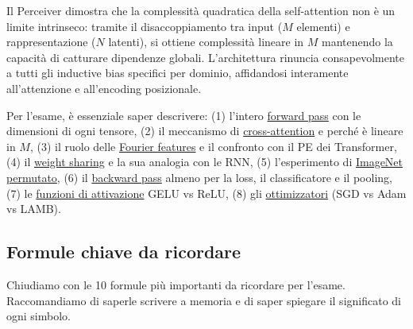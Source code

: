 \documentclass[12pt,a4paper]{article}
\begin{document}
\begin{notabox}
Il Perceiver dimostra che la complessit\`a quadratica della self-attention non \`e un limite intrinseco: tramite il disaccoppiamento tra input ($M$ elementi) e rappresentazione ($N$ latenti), si ottiene complessit\`a lineare in $M$ mantenendo la capacit\`a di catturare dipendenze globali. L'architettura rinuncia consapevolmente a tutti gli inductive bias specifici per dominio, affidandosi interamente all'attenzione e all'encoding posizionale.

Per l'esame, \`e essenziale saper descrivere: (1) l'intero \hyperref[sec:forward]{forward pass} con le dimensioni di ogni tensore, (2) il meccanismo di \hyperref[sec:ca_detail]{cross-attention} e perch\'e \`e lineare in $M$, (3) il ruolo delle \hyperref[sec:fourier]{Fourier features} e il confronto con il PE dei Transformer, (4) il \hyperref[sec:iterative]{weight sharing} e la sua analogia con le RNN, (5) l'esperimento di \hyperref[sec:imagenet_perm]{ImageNet permutato}, (6) il \hyperref[sec:backward]{backward pass} almeno per la loss, il classificatore e il pooling, (7) le \hyperref[sec:attivazioni]{funzioni di attivazione} GELU vs ReLU, (8) gli \hyperref[sec:ottimizzatori]{ottimizzatori} (SGD vs Adam vs LAMB).
\end{notabox}

\subsection{Formule chiave da ricordare} \label{sec:formule_chiave}

Chiudiamo con le 10 formule pi\`u importanti da ricordare per l'esame. Raccomandiamo di saperle scrivere a memoria e di saper spiegare il significato di ogni simbolo.
\end{document}
